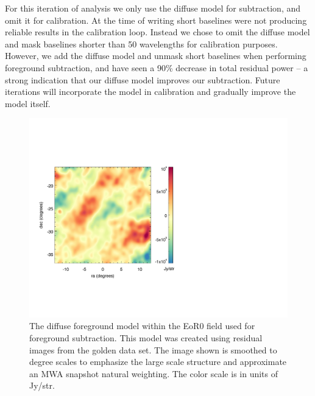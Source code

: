 \documentclass[iop]{emulateapj}
\begin{document}
For this iteration of analysis we only use the diffuse model for subtraction, and omit it for 
calibration. At the time of writing short baselines were not producing reliable results in the 
calibration loop. Instead we chose to omit the diffuse model and mask baselines shorter 
than 50 wavelengths for calibration purposes. However, we add the diffuse model and 
unmask short baselines when performing foreground subtraction, and have seen a 90\% 
decrease in total residual power -- a strong indication that our diffuse model improves our 
subtraction. Future iterations will incorporate the model in calibration and gradually improve 
the model itself. 

\begin{figure}
\begin{center}
\includegraphics[width=\columnwidth]{diffuse_sky.pdf}
\caption[Diffuse model used for subtraction]{
The diffuse foreground model within the EoR0 field used for foreground subtraction. This 
model was created using residual images from the golden data set. The image shown is 
smoothed to degree scales to emphasize the large scale structure and approximate an 
MWA snapshot natural weighting. The color scale is in units of Jy/str.
\label{fig:diffuse}
}
\end{center}
\end{figure}
\end{document}

